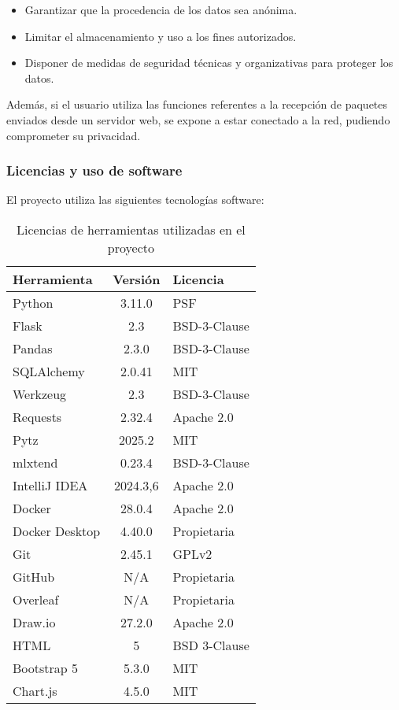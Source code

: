 \begin{itemize}
    \item Garantizar que la procedencia de los datos sea anónima.
     \item Limitar el almacenamiento y uso a los fines autorizados.
     \item Disponer de medidas de seguridad técnicas y organizativas para proteger los datos.
\end{itemize}


Además, si el usuario utiliza las funciones referentes a la recepción de paquetes enviados desde un servidor web, se expone a estar conectado a la red, pudiendo comprometer su privacidad.



\subsubsection{Licencias y uso de software}

El proyecto utiliza las siguientes tecnologías software:

\begin{table}[H]
\centering
\begin{tabular}{|l|c|l|}
\hline
\textbf{Herramienta} & \textbf{Versión} & \textbf{Licencia} \\
\hline
Python & 3.11.0 & PSF \\
Flask & 2.3 & BSD-3-Clause \\
Pandas & 2.3.0 & BSD-3-Clause \\
SQLAlchemy & 2.0.41 & MIT \\
Werkzeug & 2.3 & BSD-3-Clause \\
Requests & 2.32.4 & Apache 2.0 \\
Pytz & 2025.2 & MIT \\
mlxtend & 0.23.4 & BSD-3-Clause \\
IntelliJ IDEA & 2024.3,6 & Apache 2.0 \\
Docker & 28.0.4 & Apache 2.0 \\
Docker Desktop & 4.40.0 & Propietaria \\
Git & 2.45.1 & GPLv2 \\
GitHub & N/A & Propietaria \\
Overleaf & N/A & Propietaria \\
Draw.io & 27.2.0 & Apache 2.0 \\
HTML & 5 & BSD 3-Clause \\
Bootstrap 5 & 5.3.0 & MIT \\
Chart.js & 4.5.0 & MIT \\
\hline
\end{tabular}
\caption{Licencias de herramientas utilizadas en el proyecto}
\end{table}


